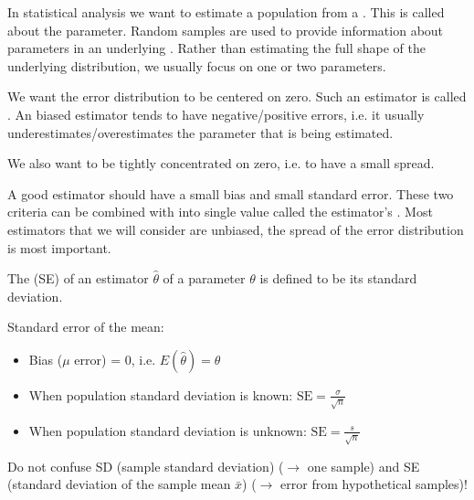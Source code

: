 In statistical analysis we want to estimate a population from a . This is called  about the parameter. Random samples are used to provide information about parameters in an underlying . Rather than estimating the full shape of the underlying distribution, we usually focus on one or two parameters.

We want the error distribution to be centered on zero. Such an estimator is called . An biased estimator tends to have negative/positive errors, i.e. it usually underestimates/overestimates the parameter that is being estimated.

We also want  to be tightly concentrated on zero, i.e. to have a small spread.

A good estimator should have a small bias and small standard error. These two criteria can be combined with into single value called the estimator's . Most estimators that we will consider are unbiased, the spread of the error distribution is most important. 

\begin{definition}
    The  (SE) of an estimator $\hat{\theta}$ of a parameter $\theta$ is defined to be its standard deviation.
\end{definition}

\begin{example}
    Standard error of the mean:
    \begin{itemize}
        \item Bias ($\mu$ error) = 0, i.e. $E(\hat{\theta})=\theta$
        \item When population standard deviation is known: $\text{SE} = \frac{\sigma}{\sqrt{n}}$
        \item When population standard deviation is unknown: $\text{SE} = \frac{s}{\sqrt{n}}$
    \end{itemize}
\end{example}

Do not confuse SD (sample standard deviation) ($\to$ one sample) and SE (standard deviation of the sample mean $\bar{x}$) ($\to$ error from hypothetical samples)!

